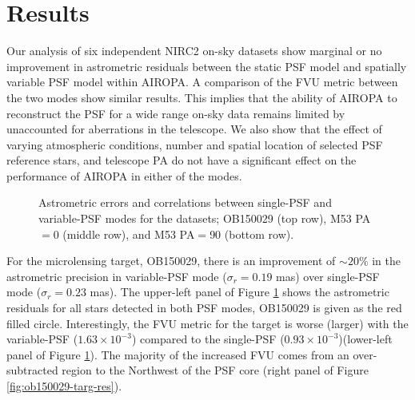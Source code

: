 \documentclass[]{spie}  %
\begin{document}

\section{Results} \label{sec:fvu-astrom-results}
Our analysis of six independent NIRC2 on-sky datasets show marginal or no improvement in astrometric residuals between the static PSF model and spatially variable PSF model within AIROPA. A comparison of the FVU metric between the two modes show similar results. This implies that the ability of AIROPA to reconstruct the PSF for a wide range on-sky data remains limited by unaccounted for aberrations in the telescope. We also show that the effect of varying atmospheric conditions, number and spatial location of selected PSF reference stars, and telescope PA do not have a significant effect on the performance of AIROPA in either of the modes.

\begin{figure}[!h]
 \caption{\footnotesize Astrometric errors and correlations between single-PSF and variable-PSF modes for the datasets; OB150029 (top row), M53 PA$=$0 (middle row), and M53 PA$=$90 (bottom row).} \label{fig:ob-m53-astrom}
\end{figure}

\indent For the microlensing target, OB150029, there is an improvement of ${\sim}20\%$ in the astrometric precision in variable-PSF mode ($\sigma_{r}=0.19$ mas) over single-PSF mode ($\sigma_{r}=0.23$ mas). The upper-left panel of Figure \ref{fig:ob-m53-astrom} shows the astrometric residuals for all stars detected in both PSF modes, OB150029 is given as the red filled circle. Interestingly, the FVU metric for the target is worse (larger) with the variable-PSF ($1.63\times10^{-3}$) compared to the single-PSF ($0.93\times10^{-3}$)(lower-left panel of Figure \ref{fig:ob-m53-astrom}). 
The majority of the increased FVU comes from an over-subtracted region to the Northwest of the PSF core (right panel of Figure \ref{fig:ob150029-targ-res}).
\end{document}
